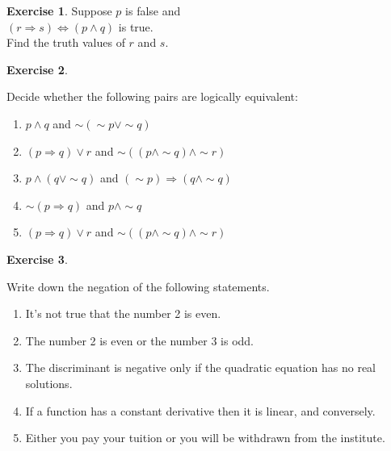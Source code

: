 \documentclass[
]{book}
\providecommand{\tightlist}{%
  \setlength{\itemsep}{0pt}\setlength{\parskip}{0pt}}
\theoremstyle{definition}
\theoremstyle{definition}
\theoremstyle{definition}
\newtheorem{exercise}{Exercise}[chapter]
\theoremstyle{definition}
\theoremstyle{remark}
\begin{document}
\begin{exercise}
\protect\hypertarget{exr:unnamed-chunk-134}{}\label{exr:unnamed-chunk-134}Suppose \(p\) is false and\\
\((r \Rightarrow s) \Leftrightarrow (p \land q)\) is true.\\
Find the truth values of \(r\) and \(s\).
\end{exercise}

\begin{exercise}
\protect\hypertarget{exr:unnamed-chunk-135}{}\label{exr:unnamed-chunk-135}

Decide whether the following pairs are logically equivalent:

\begin{enumerate}
\def\labelenumi{(\roman{enumi})}
\tightlist
\item
  \(p \land q\) and \(\sim(\sim p \lor \sim q)\)\\
\item
  \((p \Rightarrow q) \lor r\) and \(\sim((p \land \sim q) \land \sim r)\)\\
\item
  \(p \land (q \lor \sim q)\) and \((\sim p) \Rightarrow (q \land \sim q)\)\\
\item
  \(\sim(p \Rightarrow q)\) and \(p \land \sim q\)\\
\item
  \((p \Rightarrow q) \lor r\) and \(\sim((p \land \sim q) \land \sim r)\)
\end{enumerate}

\end{exercise}

\begin{exercise}
\protect\hypertarget{exr:unnamed-chunk-136}{}\label{exr:unnamed-chunk-136}

Write down the negation of the following statements.

\begin{enumerate}
\def\labelenumi{(\roman{enumi})}
\tightlist
\item
  It's not true that the number 2 is even.\\
\item
  The number 2 is even or the number 3 is odd.\\
\item
  The discriminant is negative only if the quadratic equation has no real solutions.\\
\item
  If a function has a constant derivative then it is linear, and conversely.\\
\item
  Either you pay your tuition or you will be withdrawn from the institute.
\end{enumerate}

\end{exercise}
\end{document}

